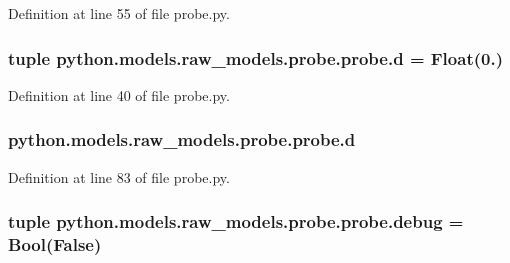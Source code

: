 Definition at line 55 of file probe.\-py.

\hypertarget{classpython_1_1models_1_1raw__models_1_1probe_1_1probe_ad0a0cc768c75ec81f9afec0cd3572bc3}{
\subsubsection[{d}]{\setlength{\rightskip}{0pt plus 5cm}tuple python.\-models.\-raw\-\_\-models.\-probe.\-probe.\-d = Float(0.)\hspace{0.3cm}{\ttfamily [static]}}}\label{classpython_1_1models_1_1raw__models_1_1probe_1_1probe_ad0a0cc768c75ec81f9afec0cd3572bc3}


Definition at line 40 of file probe.\-py.

\hypertarget{classpython_1_1models_1_1raw__models_1_1probe_1_1probe_aceec6c476ff8f04cf592770ab4ffc265}{
\subsubsection[{d}]{\setlength{\rightskip}{0pt plus 5cm}python.\-models.\-raw\-\_\-models.\-probe.\-probe.\-d}}\label{classpython_1_1models_1_1raw__models_1_1probe_1_1probe_aceec6c476ff8f04cf592770ab4ffc265}


Definition at line 83 of file probe.\-py.

\hypertarget{classpython_1_1models_1_1raw__models_1_1probe_1_1probe_a789d00d24172f18ac0edf98f3f8b49a0}{
\subsubsection[{debug}]{\setlength{\rightskip}{0pt plus 5cm}tuple python.\-models.\-raw\-\_\-models.\-probe.\-probe.\-debug = Bool(False)\hspace{0.3cm}{\ttfamily [static]}}}\label{classpython_1_1models_1_1raw__models_1_1probe_1_1probe_a789d00d24172f18ac0edf98f3f8b49a0}


